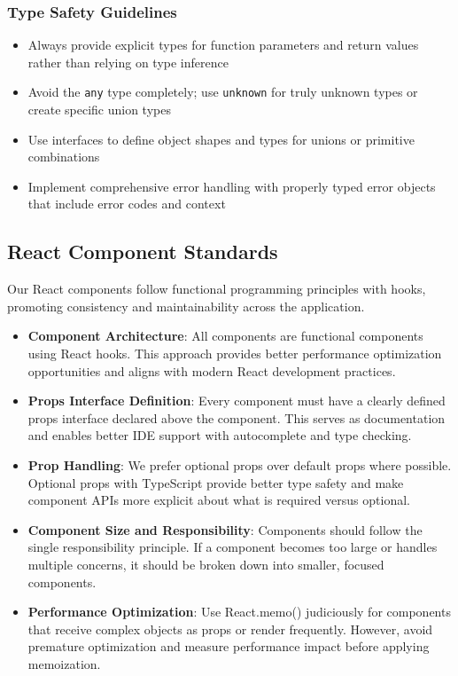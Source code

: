 \documentclass[12pt]{article}
\begin{document}
\subsubsection{Type Safety Guidelines}
\begin{itemize}
    \item Always provide explicit types for function parameters and return values rather than relying on type inference
    \item Avoid the \texttt{any} type completely; use \texttt{unknown} for truly unknown types or create specific union types
    \item Use interfaces to define object shapes and types for unions or primitive combinations
    \item Implement comprehensive error handling with properly typed error objects that include error codes and context
\end{itemize}

\subsection{React Component Standards}
Our React components follow functional programming principles with hooks, promoting consistency and maintainability across the application.

\begin{itemize}
    \item \textbf{Component Architecture}: All components are functional components using React hooks. This approach provides better performance optimization opportunities and aligns with modern React development practices.
    
    \item \textbf{Props Interface Definition}: Every component must have a clearly defined props interface declared above the component. This serves as documentation and enables better IDE support with autocomplete and type checking.
    
    \item \textbf{Prop Handling}: We prefer optional props over default props where possible. Optional props with TypeScript provide better type safety and make component APIs more explicit about what is required versus optional.
    
    \item \textbf{Component Size and Responsibility}: Components should follow the single responsibility principle. If a component becomes too large or handles multiple concerns, it should be broken down into smaller, focused components.
    
    \item \textbf{Performance Optimization}: Use React.memo() judiciously for components that receive complex objects as props or render frequently. However, avoid premature optimization and measure performance impact before applying memoization.
\end{itemize}
\end{document}
